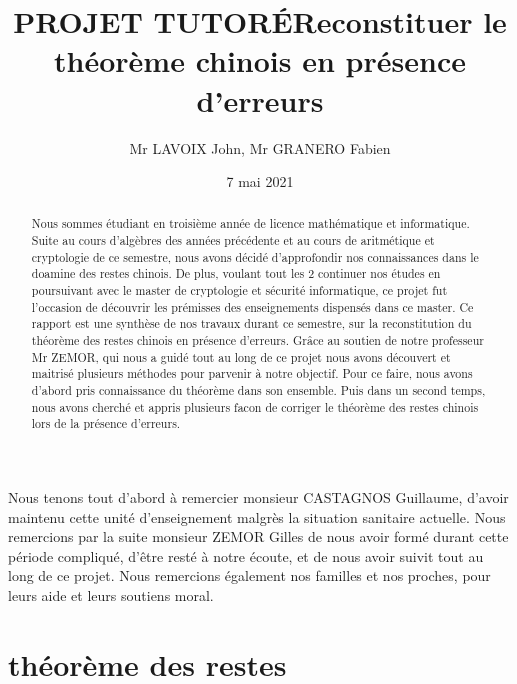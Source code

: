 \documentclass[a4paper, 11pt]{report}
\title{PROJET TUTORÉ\newline Reconstituer le théorème chinois en présence d’erreurs}
\author{Mr LAVOIX John, Mr GRANERO Fabien }
\date{7 mai 2021}
\begin{document}
\maketitle
\newpage
\begin{abstract}

Nous sommes étudiant en troisième année de licence mathématique et informatique. 
Suite au cours d'algèbres des années précédente 
et au cours de aritmétique et cryptologie de ce semestre, nous avons décidé d'approfondir nos connaissances dans le doamine des restes chinois.
De plus, voulant tout les 2 continuer nos études en poursuivant avec le master de cryptologie et sécurité informatique, ce projet fut l'occasion de découvrir les prémisses des enseignements dispensés dans ce master. \newline
\newline
\newline
Ce rapport est  une synthèse de nos travaux durant ce semestre, sur la reconstitution du théorème des restes chinois en présence d'erreurs.
Grâce au soutien de notre professeur Mr ZEMOR, qui nous a guidé tout au long de ce projet nous avons découvert et maitrisé plusieurs méthodes pour parvenir à notre objectif.
Pour ce faire, nous avons d'abord pris connaissance du théorème dans son ensemble. Puis dans un second temps, nous avons cherché et appris plusieurs facon de corriger le théorème des restes chinois lors de la présence d'erreurs.

\end{abstract}


\tableofcontents

\newpage

\begin{flushleft}
    Nous tenons tout d'abord à remercier monsieur CASTAGNOS Guillaume, d'avoir maintenu cette unité d'enseignement malgrès la situation sanitaire actuelle.  
Nous remercions par la suite monsieur ZEMOR Gilles de nous avoir formé durant cette période compliqué, d'être resté à notre écoute, et de nous avoir suivit tout au long de ce projet.
\newline 
Nous remercions également nos familles et nos proches, pour leurs aide et leurs soutiens moral.
\end{flushleft}


\chapter{théorème des restes}
\end{document}

